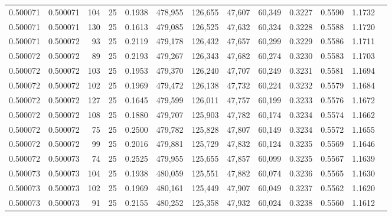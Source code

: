 \begin{tabular}{rrrrrrrrrrrrr}
0.500071 & 0.500071 &   104 &  25 &                                     0.1938 & 478,955 & 126,655 &  47,607 &  60,349 & 0.3227 & 0.5590 & 1.1732 \\
0.500071 & 0.500071 &   130 &  25 &                                     0.1613 & 479,085 & 126,525 &  47,632 &  60,324 & 0.3228 & 0.5588 & 1.1720 \\
0.500071 & 0.500072 &    93 &  25 &                                     0.2119 & 479,178 & 126,432 &  47,657 &  60,299 & 0.3229 & 0.5586 & 1.1711 \\
0.500072 & 0.500072 &    89 &  25 &                                     0.2193 & 479,267 & 126,343 &  47,682 &  60,274 & 0.3230 & 0.5583 & 1.1703 \\
0.500072 & 0.500072 &   103 &  25 &                                     0.1953 & 479,370 & 126,240 &  47,707 &  60,249 & 0.3231 & 0.5581 & 1.1694 \\
0.500072 & 0.500072 &   102 &  25 &                                     0.1969 & 479,472 & 126,138 &  47,732 &  60,224 & 0.3232 & 0.5579 & 1.1684 \\
0.500072 & 0.500072 &   127 &  25 &                                     0.1645 & 479,599 & 126,011 &  47,757 &  60,199 & 0.3233 & 0.5576 & 1.1672 \\
0.500072 & 0.500072 &   108 &  25 &                                     0.1880 & 479,707 & 125,903 &  47,782 &  60,174 & 0.3234 & 0.5574 & 1.1662 \\
0.500072 & 0.500072 &    75 &  25 &                                     0.2500 & 479,782 & 125,828 &  47,807 &  60,149 & 0.3234 & 0.5572 & 1.1655 \\
0.500072 & 0.500072 &    99 &  25 &                                     0.2016 & 479,881 & 125,729 &  47,832 &  60,124 & 0.3235 & 0.5569 & 1.1646 \\
0.500072 & 0.500073 &    74 &  25 &                                     0.2525 & 479,955 & 125,655 &  47,857 &  60,099 & 0.3235 & 0.5567 & 1.1639 \\
0.500073 & 0.500073 &   104 &  25 &                                     0.1938 & 480,059 & 125,551 &  47,882 &  60,074 & 0.3236 & 0.5565 & 1.1630 \\
0.500073 & 0.500073 &   102 &  25 &                                     0.1969 & 480,161 & 125,449 &  47,907 &  60,049 & 0.3237 & 0.5562 & 1.1620 \\
0.500073 & 0.500073 &    91 &  25 &                                     0.2155 & 480,252 & 125,358 &  47,932 &  60,024 & 0.3238 & 0.5560 & 1.1612 \\

\end{tabular}
